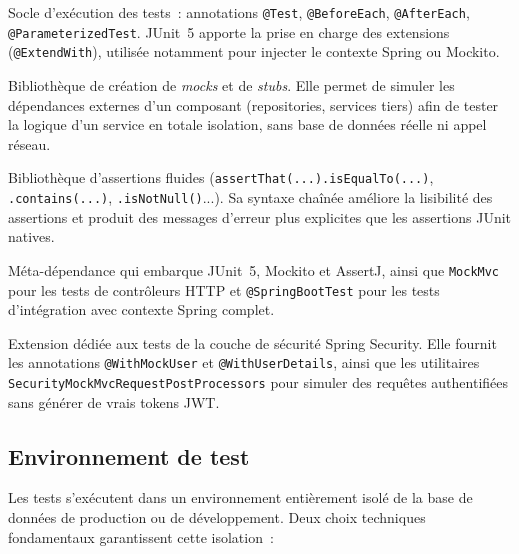 \begin{description}[leftmargin=0.5cm]
  \item[\textbf{JUnit~5} (\textit{Jupiter})]
    Socle d'exécution des tests~: annotations \texttt{@Test}, \texttt{@BeforeEach},
    \texttt{@AfterEach}, \texttt{@ParameterizedTest}. JUnit~5 apporte la prise en charge
    des extensions (\texttt{@ExtendWith}), utilisée notamment pour injecter le contexte
    Spring ou Mockito.

  \item[\textbf{Mockito}]
    Bibliothèque de création de \textit{mocks} et de \textit{stubs}. Elle permet de
    simuler les dépendances externes d'un composant (repositories, services tiers) afin de
    tester la logique d'un service en totale isolation, sans base de données réelle ni
    appel réseau.

  \item[\textbf{AssertJ}]
    Bibliothèque d'assertions fluides (\texttt{assertThat(...).isEqualTo(...)},
    \texttt{.contains(...)}, \texttt{.isNotNull()}...). Sa syntaxe chaînée améliore la
    lisibilité des assertions et produit des messages d'erreur plus explicites que les
    assertions JUnit natives.

  \item[\textbf{spring-boot-starter-test}]
    Méta-dépendance qui embarque JUnit~5, Mockito et AssertJ, ainsi que
    \texttt{MockMvc} pour les tests de contrôleurs HTTP et \texttt{@SpringBootTest} pour
    les tests d'intégration avec contexte Spring complet.

  \item[\textbf{spring-security-test}]
    Extension dédiée aux tests de la couche de sécurité Spring Security. Elle fournit les
    annotations \texttt{@WithMockUser} et \texttt{@WithUserDetails}, ainsi que les
    utilitaires \texttt{SecurityMockMvcRequestPostProcessors} pour simuler des requêtes
    authentifiées sans générer de vrais tokens JWT.
\end{description}

\subsection{Environnement de test}
\label{subsec:env-test}

Les tests s'exécutent dans un environnement entièrement isolé de la base de données de
production ou de développement. Deux choix techniques fondamentaux garantissent cette
isolation~:

